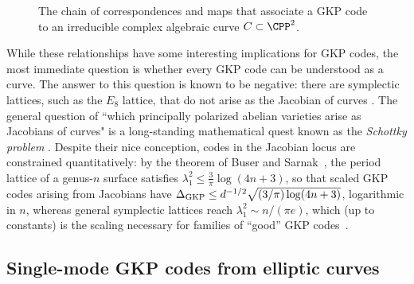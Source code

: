 \documentclass[a4paper, aps, pra, 11pt, onecolumn, tightenlines, superscriptaddress]{revtex4-2}
\begin{document}
\begin{figure}
\centering
{}
\caption{The chain of correspondences and maps that associate a GKP code to an irreducible complex algebraic curve $C\subset \CPP^2$.}\label{fig:curvesGKP}
\end{figure}
 
While these relationships have some interesting implications for GKP codes, the most immediate question is whether every GKP code can be understood as a curve. 
The answer to this question is known to be negative: there are symplectic lattices, such as the $E_8$ lattice, that do not arise as the Jacobian of curves \cite{Sarnak1994, Berge}. 
The general question of ``which principally polarized abelian varieties arise as Jacobians of curves" is a long-standing mathematical quest known as the \emph{Schottky problem} \cite{Sarnak1994, grushevsky2010schottky}. Despite their nice conception, codes in the Jacobian locus are constrained quantitatively: by the theorem of Buser and Sarnak~\cite{Sarnak1994}, the period lattice of a genus-$n$ surface satisfies $\lambda_1^2\leq\frac{3}{\pi}\log(4n+3)$, so that scaled GKP codes arising from Jacobians have $\Delta_{\rm GKP}\leq d^{-1/2}\sqrt{(3/\pi)\log(4n+3)}$, logarithmic in $n$, whereas general symplectic lattices reach $\lambda_1^2\sim n/(\pi e)$, which (up to constants) is the scaling necessary for families of ``good'' GKP codes~\cite{HarringtonPreskill, conrad2023good}.

\subsection{Single-mode GKP codes from elliptic curves}
\end{document}

